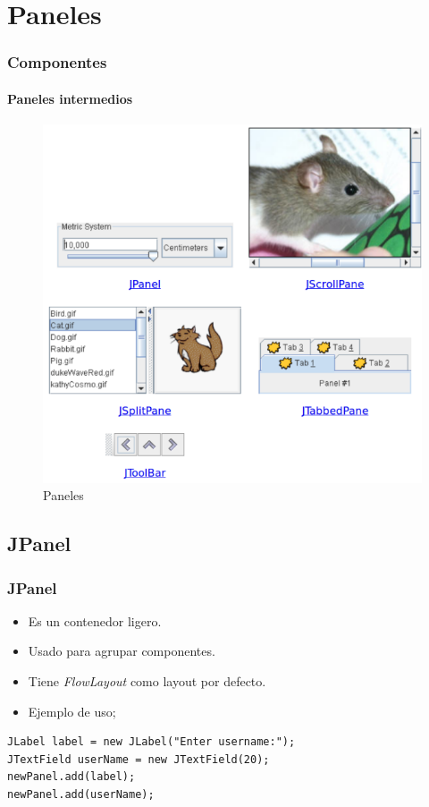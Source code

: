 \documentclass{beamer}
\begin{document}
\section{Paneles}
\begin{frame}
\frametitle{Componentes}
\framesubtitle{Paneles intermedios}
\begin{figure}
\includegraphics[scale=0.4]{imagenes/paneles.png}
\caption{Paneles}
\end{figure}
\end{frame}

\subsection{JPanel}


\begin{frame}[fragile]
\frametitle{JPanel}
\begin{itemize}[<+->]
\item Es un contenedor ligero.
\item Usado para agrupar componentes.
\item Tiene \emph{FlowLayout} como layout por defecto.
\item Ejemplo de uso;
\end{itemize}
\pause
\begin{verbatim}
JLabel label = new JLabel("Enter username:");
JTextField userName = new JTextField(20);
newPanel.add(label);
newPanel.add(userName);
\end{verbatim}
\end{frame}
\end{document}
